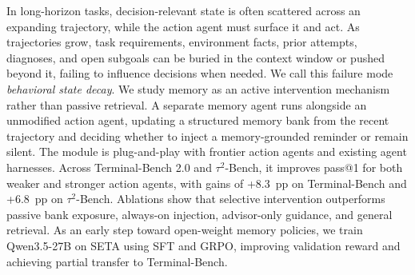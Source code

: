 In long-horizon tasks, decision-relevant state is often scattered across an expanding trajectory, while the action agent must surface it and act.
%
As trajectories grow, task requirements, environment facts, prior attempts, diagnoses, and open subgoals can be buried in the context window or pushed beyond it, failing to influence decisions when needed.
%
We call this failure mode \emph{behavioral state decay}.
%
We study memory as an active intervention mechanism rather than passive retrieval.
%
A separate memory agent runs alongside an unmodified action agent, updating a structured memory bank from the recent trajectory and deciding whether to inject a memory-grounded reminder or remain silent.
%
The module is plug-and-play with frontier action agents and existing agent harnesses.
%
Across Terminal-Bench 2.0 and $\tau^2$-Bench, it improves pass@1 for both weaker and stronger action agents, with gains of +8.3~pp on Terminal-Bench and +6.8~pp on $\tau^2$-Bench.
%
Ablations show that selective intervention outperforms passive bank exposure, always-on injection, advisor-only guidance, and general retrieval.
%
As an early step toward open-weight memory policies, we train Qwen3.5-27B on SETA using SFT and GRPO, improving validation reward and achieving partial transfer to Terminal-Bench.